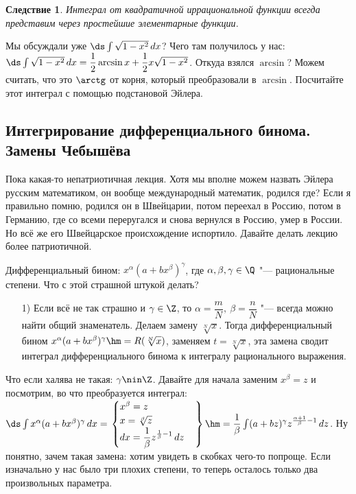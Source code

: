 \documentclass[a4paper,10pt,twoside]{article}
\newtheorem{Sl}{Следствие}[section]
\begin{document}
 \begin{Sl}
 	Интеграл от квадратичной иррациональной функции всегда представим через простейшие элементарные функции.
 \end{Sl}
 
 Мы обсуждали уже $\ds\int\sqrt{1-x^2}\,dx$? Чего там получилось у нас: $\ds\int\sqrt{1-x^2}\,dx=\dfrac12\arcsin x+\dfrac12 x\sqrt{1-x^2}$.
 Откуда взялся $\arcsin$? Можем считать, что это $\arctg$ от корня, который преобразовали в $\arcsin$. Посчитайте этот интеграл с помощью
 подстановой Эйлера.
 
 \subsection{Интегрирование дифференциального бинома. Замены Чебышёва}
 Пока какая-то непатриотичная лекция. Хотя мы вполне можем назвать Эйлера русским математиком, он вообще международный математик, родился где?
 Если я правильно помню, родился он в Швейцарии, потом переехал в Россию, потом в Германию, где со всеми переругался и снова вернулся в Россию, умер 
 в России. Но всё же его Швейцарское происхождение испортило. Давайте делать лекцию более патриотичной.
 
 Дифференциальный бином: $x^\alpha(a+bx^\beta)^\gamma$, где $\alpha,\beta,\gamma\in\Q$ "--- рациональные степени. Что с этой страшной штукой делать?
 
 \begin{itemize}
   \item [1)] Если всё не так страшно и $\gamma\in\Z$, то $\alpha=\dfrac{m}{N},\ \beta=\dfrac nN$ "--- всегда можно найти общий знаменатель.
   Делаем замену $\sqrt[N]{x}$. Тогда дифференциальный бином $x^\alpha(a+bx^\beta)^\gamma\hm=R(\sqrt[N]{x})$, заменяем $t=\sqrt[N]{x}$, эта
   замена сводит интеграл дифференциального бинома к интегралу рационального выражения.
 \end{itemize}
 
 Что если халява не такая: $\gamma\nin \Z$. Давайте для начала заменим $x^\beta=z$ и посмотрим, во что преобразуется интеграл: 
 $\ds\int x^\alpha(a+bx^\beta)^\gamma\,dx=\left.\begin{cases}
 x^\beta=z\\ x=\sqrt[\beta]{z}\\ dx=\dfrac1\beta z^{\frac1\beta-1}\,dz
 \end{cases}\right\}\hm=\dfrac1\beta\int(a+bz)^\gamma z^{\frac{\alpha+1}\beta-1}\,dz$. Ну понятно, зачем такая замена: хотим увидеть в скобках
 чего-то попроще. Если изначально у нас было три плохих степени, то теперь осталось только два произвольных параметра.
 
\end{document}
